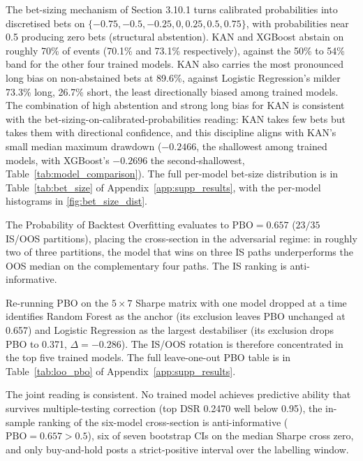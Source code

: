 The bet-sizing mechanism of Section 3.10.1 turns calibrated probabilities into discretised bets on $\{-0.75, -0.5, -0.25, 0, 0.25, 0.5, 0.75\}$, with probabilities near 0.5 producing zero bets (structural abstention). KAN and XGBoost abstain on roughly 70\% of events (70.1\% and 73.1\% respectively), against the 50\% to 54\% band for the other four trained models. KAN also carries the most pronounced long bias on non-abstained bets at 89.6\%, against Logistic Regression's milder 73.3\% long, 26.7\% short, the least directionally biased among trained models. The combination of high abstention and strong long bias for KAN is consistent with the bet-sizing-on-calibrated-probabilities reading: KAN takes few bets but takes them with directional confidence, and this discipline aligns with KAN's small median maximum drawdown ($-0.2466$, the shallowest among trained models, with XGBoost's $-0.2696$ the second-shallowest, Table~\ref{tab:model_comparison}). The full per-model bet-size distribution is in \label{ref:bet_size_call}Table~\ref{tab:bet_size} of Appendix~\ref{app:supp_results}, with the per-model histograms in \label{ref:bet_size_dist_call}\autoref{fig:bet_size_dist}.

The Probability of Backtest Overfitting evaluates to $\text{PBO} = 0.657$ ($23 / 35$ IS/OOS partitions), placing the cross-section in the adversarial regime: in roughly two of three partitions, the model that wins on three IS paths underperforms the OOS median on the complementary four paths. The IS ranking is anti-informative.

Re-running PBO on the $5 \times 7$ Sharpe matrix with one model dropped at a time identifies Random Forest as the anchor (its exclusion leaves PBO unchanged at 0.657) and Logistic Regression as the largest destabiliser (its exclusion drops PBO to 0.371, $\Delta = -0.286$). The IS/OOS rotation is therefore concentrated in the top five trained models. The full leave-one-out PBO table is in \label{ref:loo_pbo_call}Table~\ref{tab:loo_pbo} of Appendix~\ref{app:supp_results}.

The joint reading is consistent. No trained model achieves predictive ability that survives multiple-testing correction (top DSR 0.2470 well below 0.95), the in-sample ranking of the six-model cross-section is anti-informative ($\text{PBO} = 0.657 > 0.5$), six of seven bootstrap CIs on the median Sharpe cross zero, and only buy-and-hold posts a strict-positive interval over the labelling window.


